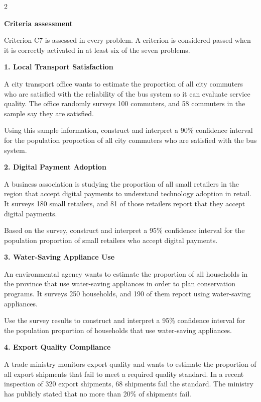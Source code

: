 \documentclass[12pt]{article}
\newcommand{\SubsectionBox}[1]{%
	\noindent\colorbox{gray!30}{%
		\parbox{\linewidth}{\textbf{#1}}%
	}\par\vspace{0.35cm}%
}
\begin{document}
	\begin{multicols}{2}
		\SubsectionBox{Criteria assessment}\vspace{-0.25cm}
		Criterion C7 is assessed in every problem. A criterion is considered passed when it is correctly activated in at least six of the seven problems.
		
		\vspace{0.25cm}
		\SubsectionBox{1. Local Transport Satisfaction}\vspace{-0.25cm}
		A city transport office wants to estimate the proportion of all city commuters who are satisfied with the reliability of the bus system so it can evaluate service quality. The office randomly surveys 100 commuters, and 58 commuters in the sample say they are satisfied.

		Using this sample information, construct and interpret a 90\% confidence interval for the population proportion of all city commuters who are satisfied with the bus system.
		
		\vspace{0.25cm}
		\SubsectionBox{2. Digital Payment Adoption}\vspace{-0.25cm}
		A business association is studying the proportion of all small retailers in the region that accept digital payments to understand technology adoption in retail. It surveys 180 small retailers, and 81 of those retailers report that they accept digital payments.

		Based on the survey, construct and interpret a 95\% confidence interval for the population proportion of small retailers who accept digital payments.
		
		\vspace{0.25cm}
		\SubsectionBox{3. Water-Saving Appliance Use}\vspace{-0.25cm}
		An environmental agency wants to estimate the proportion of all households in the province that use water-saving appliances in order to plan conservation programs. It surveys 250 households, and 190 of them report using water-saving appliances.

		Use the survey results to construct and interpret a 95\% confidence interval for the population proportion of households that use water-saving appliances.
		
		\vspace{0.25cm}
		\SubsectionBox{4. Export Quality Compliance}\vspace{-0.25cm}
		A trade ministry monitors export quality and wants to estimate the proportion of all export shipments that fail to meet a required quality standard. In a recent inspection of 320 export shipments, 68 shipments fail the standard. The ministry has publicly stated that no more than 20\% of shipments fail.


\end{multicols}
\end{document}
